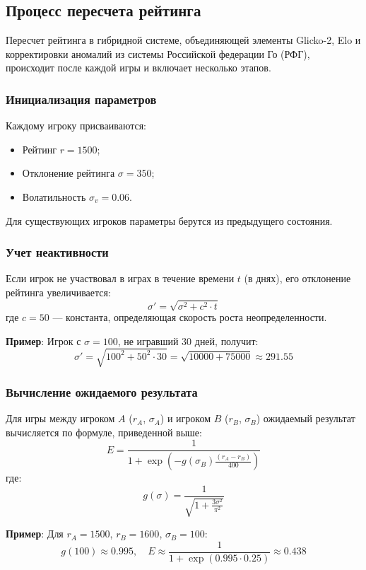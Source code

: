 \documentclass[12pt]{article}
\begin{document}
\subsection*{Процесс пересчета рейтинга}

Пересчет рейтинга в гибридной системе, объединяющей элементы Glicko-2, Elo и корректировки аномалий из системы Российской федерации Го (РФГ), происходит после каждой игры и включает несколько этапов.

\subsubsection*{Инициализация параметров}
Каждому игроку присваиваются:
\begin{itemize}
    \item Рейтинг \( r = 1500 \);
    \item Отклонение рейтинга \( \sigma = 350 \);
    \item Волатильность \( \sigma_v = 0.06 \).
\end{itemize}
Для существующих игроков параметры берутся из предыдущего состояния.

\subsubsection*{Учет неактивности}
Если игрок не участвовал в играх в течение времени \( t \) (в днях), его отклонение рейтинга увеличивается:
\[
\sigma' = \sqrt{\sigma^2 + c^2 \cdot t}
\]
где \( c = 50 \) --- константа, определяющая скорость роста неопределенности.

\textbf{Пример}: Игрок с \( \sigma = 100 \), не игравший 30 дней, получит:
\[
\sigma' = \sqrt{100^2 + 50^2 \cdot 30} = \sqrt{10000 + 75000} \approx 291.55
\]

\subsubsection*{Вычисление ожидаемого результата}
Для игры между игроком \( A \) (\( r_A \), \( \sigma_A \)) и игроком \( B \) (\( r_B \), \( \sigma_B \)) ожидаемый результат вычисляется по формуле, приведенной выше:
\[
E = \frac{1}{1 + \exp\left(-g(\sigma_B)\frac{(r_A - r_B)}{400}\right)}
\]
где:
\[
g(\sigma) = \frac{1}{\sqrt{1 + \frac{3\sigma^2}{\pi^2}}}
\]

\textbf{Пример}: Для \( r_A = 1500 \), \( r_B = 1600 \), \( \sigma_B = 100 \):
\[
g(100) \approx 0.995, \quad E \approx \frac{1}{1 + \exp(0.995 \cdot 0.25)} \approx 0.438
\]
\end{document}
